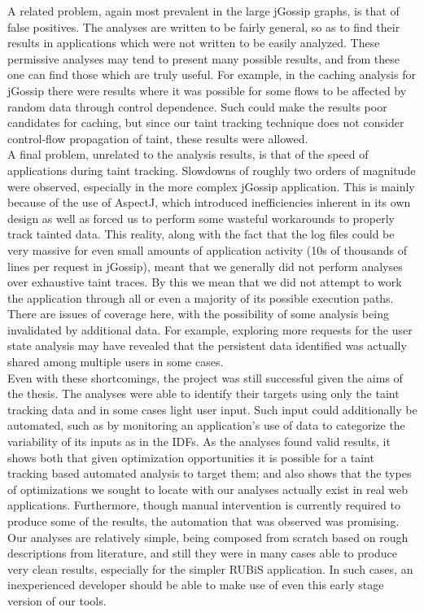 \documentclass[msc,oneside]{ubcthesis}
\begin{document}
A related problem, again most prevalent in the large jGossip graphs, is that of false positives. The analyses are written to be fairly general, so as to find their results in applications which were not written to be easily analyzed. These permissive analyses may tend to present many possible results, and from these one can find those which are truly useful. For example, in the caching analysis for jGossip there were results where it was possible for some flows to be affected by random data through control dependence. Such could make the results poor candidates for caching, but since our taint tracking technique does not consider control-flow propagation of taint, these results were allowed.\\

A final problem, unrelated to the analysis results, is that of the speed of applications during taint tracking. Slowdowns of roughly two orders of magnitude were observed, especially in the more complex jGossip application. This is mainly because of the use of AspectJ, which introduced inefficiencies inherent in its own design as well as forced us to perform some wasteful workarounds to properly track tainted data. This reality, along with the fact that the log files could be very massive for even small amounts of application activity (10s of thousands of lines per request in jGossip), meant that we generally did not perform analyses over exhaustive taint traces. By this we mean that we did not attempt to work the application through all or even a majority of its possible execution paths. There are issues of coverage here, with the possibility of some analysis being invalidated by additional data. For example, exploring more requests for the user state analysis may have revealed that the persistent data identified was actually shared among multiple users in some cases.\\

Even with these shortcomings, the project was still successful given the aims of the thesis. The analyses were able to identify their targets using only the taint tracking data and in some cases light user input. Such input could additionally be automated, such as by monitoring an application's use of data to categorize the variability of its inputs as in the IDFs. As the analyses found valid results, it shows both that given optimization opportunities it is possible for a taint tracking based automated analysis to target them; and also shows that the types of optimizations we sought to locate with our analyses actually exist in real web applications. Furthermore, though manual intervention is currently required to produce some of the results, the automation that was observed was promising. Our analyses are relatively simple, being composed from scratch based on rough descriptions from literature, and still they were in many cases able to produce very clean results, especially for the simpler RUBiS application. In such cases, an inexperienced developer should be able to make use of even this early stage version of our tools.\\
\end{document}
